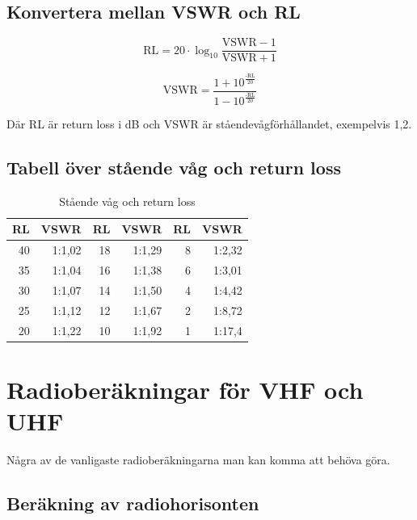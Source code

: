 \subsection{Konvertera mellan VSWR och RL}

\begin{equation}
	\text{RL} = 20 \cdot \log_{10} \frac{\text{VSWR}-1}{\text{VSWR}+1}
\end{equation}

\begin{equation}
	\text{VSWR} = \frac{1+10^\frac{\text{-RL}}{20}}{1-10^\frac{\text{-RL}}{20}}
\end{equation}

Där RL är return loss i dB och VSWR är ståendevågförhållandet, exempelvis 1,2.

\subsection{Tabell över stående våg och return loss}

\begin{table}[H]
\centering
\begin{tabular}{rr|rr|rr}
	\textbf{RL} & \textbf{VSWR} & \textbf{RL} & \textbf{VSWR} & \textbf{RL} & \textbf{VSWR} \\ \hline
	         40 &        1:1,02 &          18 &        1:1,29 &           8 &        1:2,32 \\
	         35 &        1:1,04 &          16 &        1:1,38 &           6 &        1:3,01 \\
	         30 &        1:1,07 &          14 &        1:1,50 &           4 &        1:4,42 \\
	         25 &        1:1,12 &          12 &        1:1,67 &           2 &        1:8,72 \\
	         20 &        1:1,22 &          10 &        1:1,92 &           1 &        1:17,4
\end{tabular}
\caption{Stående våg och return loss}
\label{tab:vswr-rl}
\end{table}

\section{Radioberäkningar för VHF och UHF}

Några av de vanligaste radioberäkningarna man kan komma att behöva göra.

\subsection{Beräkning av radiohorisonten}

